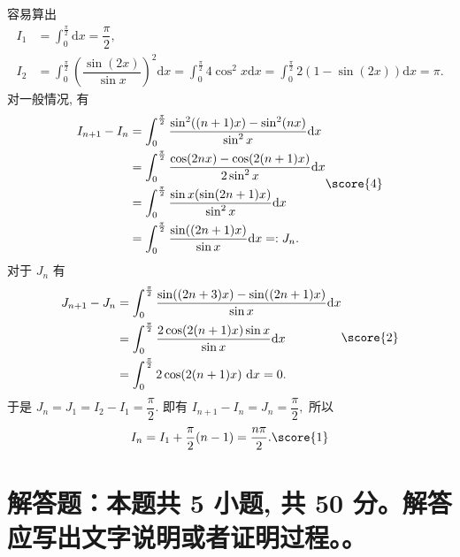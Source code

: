 \begin{solution}
容易算出 
\begin{equation*}
\begin{aligned}
I_1 & = \int_0^{\frac{\pi}{2}} \mathrm{d}x = \dfrac{\pi}{2}, \\
I_2 & = \int_0^{\frac{\pi}{2}} \left(\dfrac{\sin (2x)}{\sin x}\right)^2 \mathrm{d}x = \int_0^{\frac{\pi}{2}} 4 \cos^2 x \mathrm{d}x = \int_0^{\frac{\pi}{2}} 2(1 - \sin(2x)) \mathrm{d}x = \pi.
\end{aligned}
\end{equation*}
对一般情况, 有
\begin{equation*}
\begin{aligned}
I_{n+1} - I_{n} & = \int_0^{\frac{\pi}{2}} \dfrac{\sin^2((n+1)x) - \sin^2(nx)}{\sin^2 x} \mathrm{d}x \\
& = \int_0^{\frac{\pi}{2}} \dfrac{\cos(2nx) - \cos(2(n+1)x)}{2\sin^2 x} \mathrm{d}x \\
& = \int_0^{\frac{\pi}{2}} \dfrac{\sin x (\sin(2n+1)x)}{\sin^2 x} \mathrm{d}x \\
& = \int_0^{\frac{\pi}{2}} \dfrac{\sin((2n+1)x)}{\sin x} \mathrm{d}x =: J_n.
\end{aligned} \score{4}
\end{equation*}
对于 $J_n$ 有
\begin{equation*}
\begin{aligned}
J_{n+1} - J_n & = \int_0^{\frac{\pi}{2}} \dfrac{\sin((2n+3)x) - \sin((2n+1)x)}{\sin x} \mathrm{d}x \\
& = \int_0^{\frac{\pi}{2}} \dfrac{2 \cos(2(n+1)x) \sin x}{\sin x} \mathrm{d}x \\
& = \int_0^{\frac{\pi}{2}} 2 \cos(2(n+1)x) ~ \mathrm{d}x = 0.
\end{aligned} \score{2}
\end{equation*}
于是 $\displaystyle J_n = J_1 = I_2 - I_1 = \dfrac{\pi}{2}.$ 即有 $I_{n+1} - I_n = J_n = \dfrac{\pi}{2},$ 所以
\begin{equation*}
I_n = I_1 + \dfrac{\pi}{2}(n - 1) = \dfrac{n\pi}{2}. \score{1}
\end{equation*}
\end{solution}


\showquestionpoints
\section{解答题：本题共 5 小题, 共 50 分。解答应写出文字说明或者证明过程。。}


